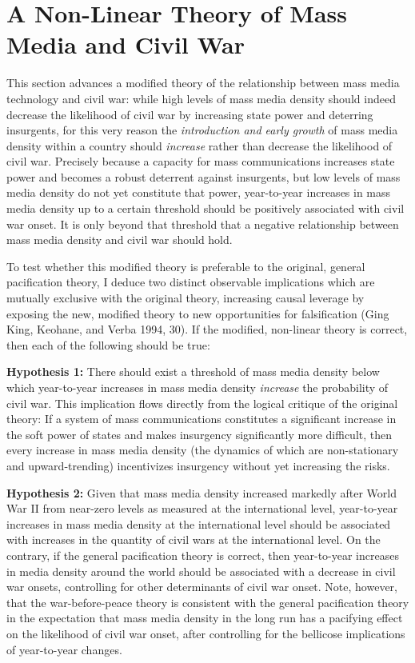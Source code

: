 \documentclass[11pt,article,oneside]{memoir}
\begin{document}
\section{A Non-Linear Theory of Mass Media and Civil
War}\label{a-non-linear-theory-of-mass-media-and-civil-war}

This section advances a modified theory of the relationship between mass
media technology and civil war: while high levels of mass media density
should indeed decrease the likelihood of civil war by increasing state
power and deterring insurgents, for this very reason the
\emph{introduction and early growth} of mass media density within a
country should \emph{increase} rather than decrease the likelihood of
civil war. Precisely because a capacity for mass communications
increases state power and becomes a robust deterrent against insurgents,
but low levels of mass media density do not yet constitute that power,
year-to-year increases in mass media density up to a certain threshold
should be positively associated with civil war onset. It is only beyond
that threshold that a negative relationship between mass media density
and civil war should hold.

To test whether this modified theory is preferable to the original,
general pacification theory, I deduce two distinct observable
implications which are mutually exclusive with the original theory,
increasing causal leverage by exposing the new, modified theory to new
opportunities for falsification (Ging King, Keohane, and Verba 1994,
30). If the modified, non-linear theory is correct, then each of the
following should be true:

\textbf{Hypothesis 1:} There should exist a threshold of mass media
density below which year-to-year increases in mass media density
\emph{increase} the probability of civil war. This implication flows
directly from the logical critique of the original theory: If a system
of mass communications constitutes a significant increase in the soft
power of states and makes insurgency significantly more difficult, then
every increase in mass media density (the dynamics of which are
non-stationary and upward-trending) incentivizes insurgency without yet
increasing the risks.

\textbf{Hypothesis 2:} Given that mass media density increased markedly
after World War II from near-zero levels as measured at the
international level, year-to-year increases in mass media density at the
international level should be associated with increases in the quantity
of civil wars at the international level. On the contrary, if the
general pacification theory is correct, then year-to-year increases in
media density around the world should be associated with a decrease in
civil war onsets, controlling for other determinants of civil war onset.
Note, however, that the war-before-peace theory is consistent with the
general pacification theory in the expectation that mass media density
in the long run has a pacifying effect on the likelihood of civil war
onset, after controlling for the bellicose implications of year-to-year
changes.
\end{document}
